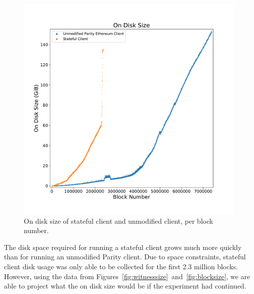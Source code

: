 \documentclass[12pt]{article}
\begin{document}
\begin{figure}[H]
  \centering
  \includegraphics[width=\textwidth]{../figures/results/graphs/background/on-disk-size.pdf}
  \caption{On disk size of stateful client and unmodified client, per block number.}
  \label{fig:ondisksize}
\end{figure}

The disk space required for running a stateful client grows much more quickly than for running an unmodified Parity client. Due to space constraints, stateful client disk usage was only able to be collected for the first 2.3 million blocks. However, using the data from Figures~\ref{fig:witnesssize}~and~\ref{fig:blocksize}, we are able to project what the on disk size would be if the experiment had continued.
\end{document}
